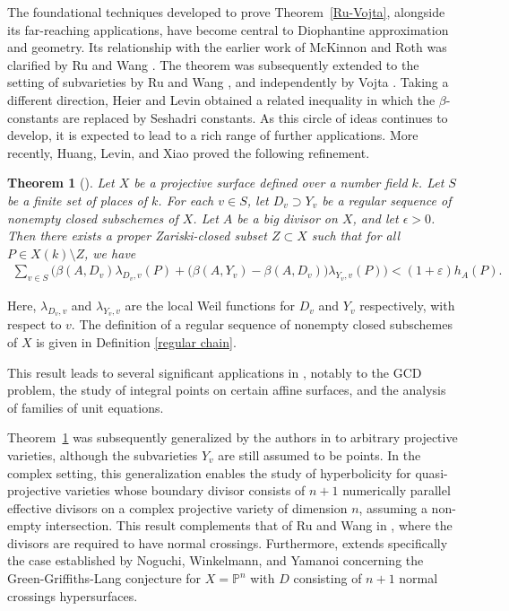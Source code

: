 \documentclass[10pt]{amsart}
\numberwithin{equation}{section}
\theoremstyle{plain}
\newtheorem{theorem}{Theorem}[section]
\theoremstyle{definition}
\begin{document}
The foundational techniques developed to prove Theorem~\ref{Ru-Vojta}, alongside its far-reaching applications, have become central to Diophantine approximation and geometry. Its relationship with the earlier work of McKinnon and Roth \cite{MR2015} was clarified by Ru and Wang \cite{RuWang2017}. The theorem was subsequently extended to the setting of subvarieties by Ru and Wang \cite{RuWang2022}, and independently by Vojta \cite{Voj2023}. Taking a different direction, Heier and Levin \cite{HL2021} obtained a related inequality in which the $\beta$-constants are replaced by Seshadri constants. As this circle of ideas continues to develop, it is expected to lead to a rich range of further applications.
More recently, Huang, Levin, and Xiao \cite{HLX}  proved the following refinement.
\begin{theorem}[{\cite[Theorem 1.4]{HLX}}]\label{chainHLX}
   Let $X$ be a projective surface defined over a number field $k$.  Let $S$ be a finite set of places of $k$.  For each $v\in S$, let $D_v\supset Y_v$ be a regular sequence of nonempty closed subschemes of $X$. Let $A$ be a big divisor on $X$, and let $\epsilon >0$.   
 Then there exists a proper  Zariski-closed subset $Z\subset X$ such that  for all  $P\in X(k)\setminus Z$, we have
  \begin{align}\label{mainineq}
\sum_{v\in S} \Bigg(
  \beta(A, D_{v})\lambda_{D_{v},v}(P)  
 + \Big( \beta(A, Y_v ) -   \beta(A, D_{v}) \Big) \lambda_{Y_v,v }(P)
\Bigg)  
 <(1+\varepsilon) h_{A}(P). 
\end{align}
\end{theorem}
Here, $\lambda_{D_{v},v} $ and  $\lambda_{Y_v,v }$ are the local  Weil functions for $D_{v}$ and $Y_v$ respectively, with respect to $v$.  The definition of a regular sequence of nonempty closed subschemes of $X$ is given in Definition \ref{regular chain}.


 This result leads to several significant applications in \cite{HLX}, notably to the GCD problem, the study of integral points on certain affine surfaces, and the analysis of families of unit equations.


Theorem~\ref{chainHLX} was subsequently generalized by the authors in \cite{WX2025} to arbitrary projective varieties, although the subvarieties $Y_v$ are still assumed to be points. In the complex setting, this generalization enables the study of hyperbolicity for quasi-projective varieties whose boundary divisor consists of $n+1$ numerically parallel effective divisors on a complex projective variety of dimension $n$, assuming a non-empty intersection.   This result complements that of Ru and Wang in \cite{RW24}, where the divisors are required to have normal crossings. Furthermore, \cite{RW24} extends specifically the case established by Noguchi, Winkelmann, and Yamanoi \cite{NWY07} concerning the Green-Griffiths-Lang conjecture for $X=\mathbb P^n$ with $D$ consisting of $n+1$ normal crossings hypersurfaces. 
\end{document}
